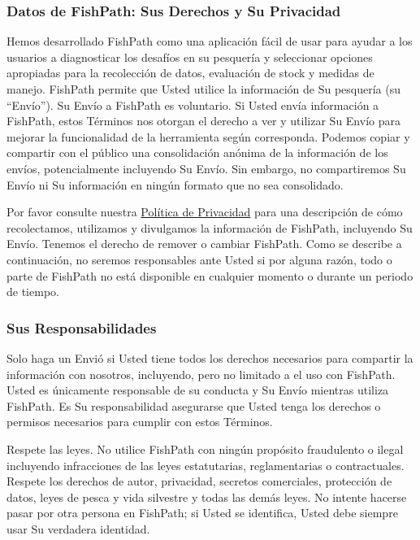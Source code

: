 \documentclass[
  11pt,
]{book}
\begin{document}
\hypertarget{datos-de-fishpath-sus-derechos-y-su-privacidad}{%
\subsubsection*{Datos de FishPath: Sus Derechos y Su Privacidad}\label{datos-de-fishpath-sus-derechos-y-su-privacidad}}

Hemos desarrollado FishPath como una aplicación fácil de usar para ayudar a los usuarios a diagnosticar los desafíos en su pesquería y seleccionar opciones apropiadas para la recolección de datos, evaluación de stock y medidas de manejo. FishPath permite que Usted utilice la información de Su pesquería (su ``Envío''). Su Envío a FishPath es voluntario. Si Usted envía información a FishPath, estos Términos nos otorgan el derecho a ver y utilizar Su Envío para mejorar la funcionalidad de la herramienta según corresponda. Podemos copiar y compartir con el público una consolidación anónima de la información de los envíos, potencialmente incluyendo Su Envío. Sin embargo, no compartiremos Su Envío ni Su información en ningún formato que no sea consolidado.

Por favor consulte nuestra \href{https://www.nature.org/en-us/about-us/who-we-are/accountability/privacy-policy/}{Política de Privacidad} para una descripción de cómo recolectamos, utilizamos y divulgamos la información de FishPath, incluyendo Su Envío. Tenemos el derecho de remover o cambiar FishPath. Como se describe a continuación, no seremos responsables ante Usted si por alguna razón, todo o parte de FishPath no está disponible en cualquier momento o durante un periodo de tiempo.

\hypertarget{sus-responsabilidades}{%
\subsubsection*{Sus Responsabilidades}\label{sus-responsabilidades}}

Solo haga un Envió si Usted tiene todos los derechos necesarios para compartir la información con nosotros, incluyendo, pero no limitado a el uso con FishPath. Usted es únicamente responsable de su conducta y Su Envío mientras utiliza FishPath. Es Su responsabilidad asegurarse que Usted tenga los derechos o permisos necesarios para cumplir con estos Términos.

Respete las leyes. No utilice FishPath con ningún propósito fraudulento o ilegal incluyendo infracciones de las leyes estatutarias, reglamentarias o contractuales. Respete los derechos de autor, privacidad, secretos comerciales, protección de datos, leyes de pesca y vida silvestre y todas las demás leyes. No intente hacerse pasar por otra persona en FishPath; si Usted se identifica, Usted debe siempre usar Su verdadera identidad.
\end{document}
